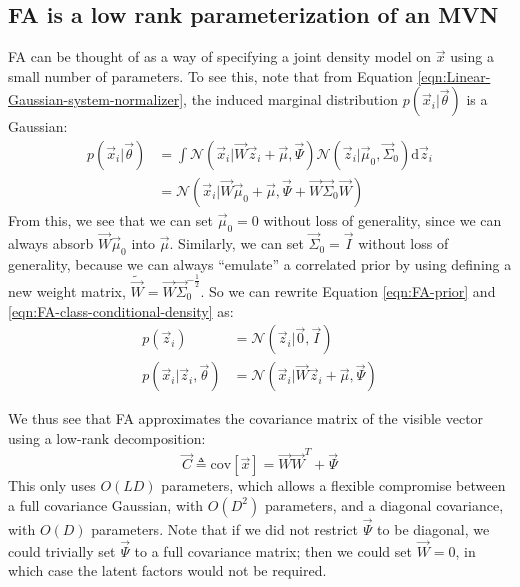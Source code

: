 \subsection{FA is a low rank parameterization of an MVN}
FA can be thought of as a way of specifying a joint density model on $\vec{x}$ using a small number of parameters. To see this, note that from Equation \eqref{eqn:Linear-Gaussian-system-normalizer}, the induced marginal distribution $p(\vec{x}_i|\vec{\theta})$ is a Gaussian:
\begin{align}
p(\vec{x}_i|\vec{\theta}) & = \int \mathcal{N}(\vec{x}_i|\vec{W}\vec{z}_i+\vec{\mu},\vec{\Psi})\mathcal{N}(\vec{z}_i|\vec{\mu}_0,\vec{\Sigma}_0)\mathrm{d}\vec{z}_i \nonumber \\
 & = \mathcal{N}(\vec{x}_i|\vec{W}\vec{\mu}_0+\vec{\mu},\vec{\Psi}+\vec{W}\vec{\Sigma}_0\vec{W})
\end{align}
From this, we see that we can set $\vec{\mu}_0=0$ without loss of generality, since we can always absorb $\vec{W}\vec{\mu}_0$ into $\vec{\mu}$. Similarly, we can set $\vec{\Sigma}_0=\vec{I}$ without loss of generality, because we can always “emulate” a correlated prior by using defining a new weight matrix, $\tilde{\vec{W}}=\vec{W}\vec{\Sigma}_0^{-\frac{1}{2}}$. So we can rewrite Equation \eqref{eqn:FA-prior} and \eqref{eqn:FA-class-conditional-density} as:
\begin{align}
p(\vec{z}_i)&=\mathcal{N}(\vec{z}_i|\vec{0},\vec{I}) \\
p(\vec{x}_i|\vec{z}_i,\vec{\theta})&=\mathcal{N}(\vec{x}_i|\vec{W}\vec{z}_i+\vec{\mu},\vec{\Psi})
\end{align}

We thus see that FA approximates the covariance matrix of the visible vector using a low-rank decomposition:
\begin{equation}\label{eqn:FA-prior}
\vec{C} \triangleq \mathrm{cov}[\vec{x}]=\vec{W}\vec{W}^T+\vec{\Psi}
\end{equation}
This only uses $O(LD)$ parameters, which allows a flexible compromise between a full covariance Gaussian, with $O(D^2)$ parameters, and a diagonal covariance, with $O(D)$ parameters. Note that if we did not restrict $\vec{\Psi}$ to be diagonal, we could trivially set $\vec{\Psi}$ to a full covariance matrix; then we could set $\vec{W}=0$, in which case the latent factors would not be required.


